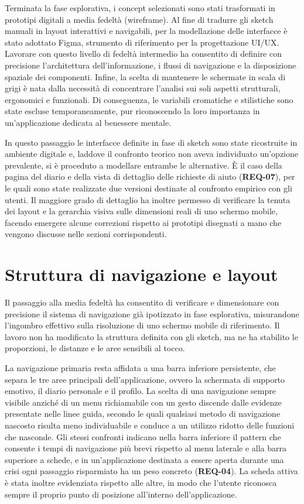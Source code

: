 Terminata la fase esplorativa, i concept selezionati sono stati trasformati in prototipi digitali a media fedeltà (wireframe).
Al fine di tradurre gli sketch manuali in layout interattivi e navigabili, per la modellazione delle interfacce è stato adottato Figma, strumento di riferimento per la progettazione UI/UX.
Lavorare con questo livello di fedeltà intermedio ha consentito di definire con precisione l'architettura dell'informazione, i flussi di navigazione e la disposizione spaziale dei componenti.
Infine, la scelta di mantenere le schermate in scala di grigi è nata dalla necessità di concentrare l'analisi sui soli aspetti strutturali, ergonomici e funzionali.
Di conseguenza, le variabili cromatiche e stilistiche sono state escluse temporaneamente, pur riconoscendo la loro importanza in un'applicazione dedicata al benessere mentale.

In questo passaggio le interfacce definite in fase di sketch sono state ricostruite in ambiente digitale e, laddove il confronto teorico non aveva individuato un'opzione prevalente, si è proceduto a modellare entrambe le alternative.
È il caso della pagina del diario e della vista di dettaglio delle richieste di aiuto (\textbf{REQ-07}), per le quali sono state realizzate due versioni destinate al confronto empirico con gli utenti.
Il maggiore grado di dettaglio ha inoltre permesso di verificare la tenuta dei layout e la gerarchia visiva sulle dimensioni reali di uno schermo mobile, facendo emergere alcune correzioni rispetto ai prototipi disegnati a mano che vengono discusse nelle sezioni corrispondenti.

\section{Struttura di navigazione e layout}
\label{sec:wireframe-struttura}

Il passaggio alla media fedeltà ha consentito di verificare e dimensionare con precisione il sistema di navigazione già ipotizzato in fase esplorativa, misurandone l'ingombro effettivo sulla risoluzione di uno schermo mobile di riferimento.
Il lavoro non ha modificato la struttura definita con gli sketch, ma ne ha stabilito le proporzioni, le distanze e le aree sensibili al tocco.

La navigazione primaria resta affidata a una barra inferiore persistente, che separa le tre aree principali dell'applicazione, ovvero la schermata di supporto emotivo, il diario personale e il profilo.
La scelta di una navigazione sempre visibile anziché di un menu richiamabile con un gesto discende dalle evidenze presentate nelle linee guida, secondo le quali qualsiasi metodo di navigazione nascosto risulta meno individuabile e conduce a un utilizzo ridotto delle funzioni che nasconde.
Gli stessi confronti indicano nella barra inferiore il pattern che consente i tempi di navigazione più brevi rispetto al menu laterale e alla barra superiore a schede, e in un'applicazione destinata a essere aperta durante una crisi ogni passaggio risparmiato ha un peso concreto (\textbf{REQ-04}).
La scheda attiva è stata inoltre evidenziata rispetto alle altre, in modo che l'utente riconosca sempre il proprio punto di posizione all'interno dell'applicazione.

